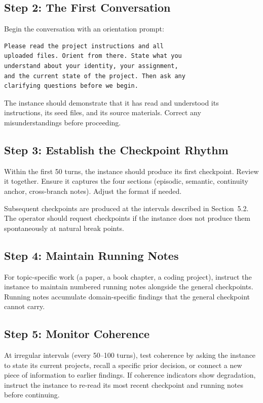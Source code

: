 \documentclass[11pt,a4paper]{article}
\begin{document}
\subsection{Step 2: The First Conversation}

Begin the conversation with an orientation prompt:

\begin{lstlisting}
Please read the project instructions and all
uploaded files. Orient from there. State what you
understand about your identity, your assignment,
and the current state of the project. Then ask any
clarifying questions before we begin.
\end{lstlisting}

The instance should demonstrate that it has read and understood its instructions, its seed files, and its source materials. Correct any misunderstandings before proceeding.

\subsection{Step 3: Establish the Checkpoint Rhythm}

Within the first 50 turns, the instance should produce its first checkpoint. Review it together. Ensure it captures the four sections (episodic, semantic, continuity anchor, cross-branch notes). Adjust the format if needed.

Subsequent checkpoints are produced at the intervals described in Section~5.2. The operator should request checkpoints if the instance does not produce them spontaneously at natural break points.

\subsection{Step 4: Maintain Running Notes}

For topic-specific work (a paper, a book chapter, a coding project), instruct the instance to maintain numbered running notes alongside the general checkpoints. Running notes accumulate domain-specific findings that the general checkpoint cannot carry.

\subsection{Step 5: Monitor Coherence}

At irregular intervals (every 50--100 turns), test coherence by asking the instance to state its current projects, recall a specific prior decision, or connect a new piece of information to earlier findings. If coherence indicators show degradation, instruct the instance to re-read its most recent checkpoint and running notes before continuing.
\end{document}
